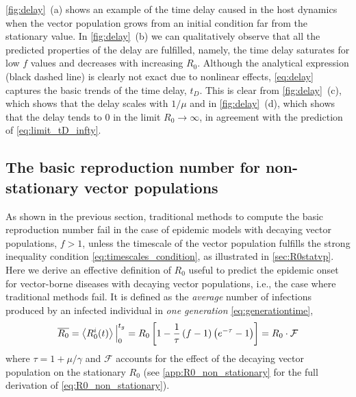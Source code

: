 \cref{fig:delay}~\textcolor{ref_color}{(a)} shows an example of the time delay
caused in the host
dynamics when the vector population grows from an initial condition far from
the stationary value. In \cref{fig:delay}~\textcolor{ref_color}{(b)} we can
qualitatively observe that
all the predicted properties of the delay are fulfilled, namely, the time delay
saturates for low $f$ values and decreases with increasing $R_0$. Although the
analytical expression (black dashed line) is clearly not exact due to nonlinear
effects, \cref{eq:delay} captures the basic trends of the time delay, $t_D$.
This is clear from \cref{fig:delay}~\textcolor{ref_color}{(c)}, which shows
that the delay scales with
$1/\mu$ and in \cref{fig:delay}~\textcolor{ref_color}{(d)}, which shows that
the delay tends to $0$ in
the limit $R_0\rightarrow\infty$, in agreement with the prediction of
\cref{eq:limit_tD_infty}.

\subsection{The basic reproduction number for non-stationary vector
    populations}

As shown in the previous section, traditional methods to compute the basic
reproduction number fail in the case of epidemic models with decaying vector
populations, $f>1$, unless the timescale of the vector population fulfills the
strong inequality condition \cref{eq:timescales_condition}, as illustrated in
\cref{sec:R0statvp}. Here we derive an effective definition of $R_0$ useful to
predict the epidemic onset for vector-borne diseases with decaying vector
populations, i.e., the case where traditional methods fail. It is defined as
the \textit{average} number of infections produced by an infected
individual in \textit{one generation} \cref{eq:generationtime},
\begin{equation}\label{eq:R0_non_stationary}
    \overline{R_0}=\left<R_{0}^{i}(t)\right>\Big\rvert_{0}^{t_g}=
    R_0\left[1-\frac{1}{\tau}\left(f-1\right)
        \left(e^{-\tau}-1\right)\right]=R_0\cdot\mathcal{F}
\end{equation}
where $\tau=1+\mu/\gamma$ and $\mathcal{F}$ accounts for the effect of the
decaying vector population on the stationary $R_0$ (see
\cref{app:R0_non_stationary} for the full derivation of
\cref{eq:R0_non_stationary}).

